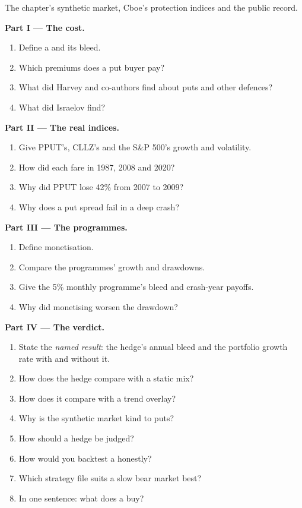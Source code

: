 \begin{problem}\label{pb:s2:tail-hedging-and-long-volatility:1}
The chapter's synthetic market, Cboe's protection indices and the public record.

\medskip\noindent\textbf{Part I --- The cost.}
\begin{enumerate}
\item Define a  and its bleed.
\item Which premiums does a put buyer pay?
\item What did Harvey and co-authors find about puts and other defences?
\item What did Israelov find?
\end{enumerate}

\medskip\noindent\textbf{Part II --- The real indices.}
\begin{enumerate}[resume]
\item Give PPUT's, CLLZ's and the S\&P 500's growth and volatility.
\item How did each fare in 1987, 2008 and 2020?
\item Why did PPUT lose 42\% from 2007 to 2009?
\item Why does a put spread fail in a deep crash?
\end{enumerate}

\medskip\noindent\textbf{Part III --- The programmes.}
\begin{enumerate}[resume]
\item Define monetisation.
\item Compare the programmes' growth and drawdowns.
\item Give the 5\% monthly programme's bleed and crash-year payoffs.
\item Why did monetising worsen the drawdown?
\end{enumerate}

\medskip\noindent\textbf{Part IV --- The verdict.}
\begin{enumerate}[resume]
\item State the \emph{named result}: the hedge's annual bleed and the portfolio growth rate with and without it.
\item How does the hedge compare with a static mix?
\item How does it compare with a trend overlay?
\item Why is the synthetic market kind to puts?
\item How should a hedge be judged?
\item How would you backtest a  honestly?
\item Which strategy file suits a slow bear market best?
\item In one sentence: what does a  buy?
\end{enumerate}
\end{problem}

